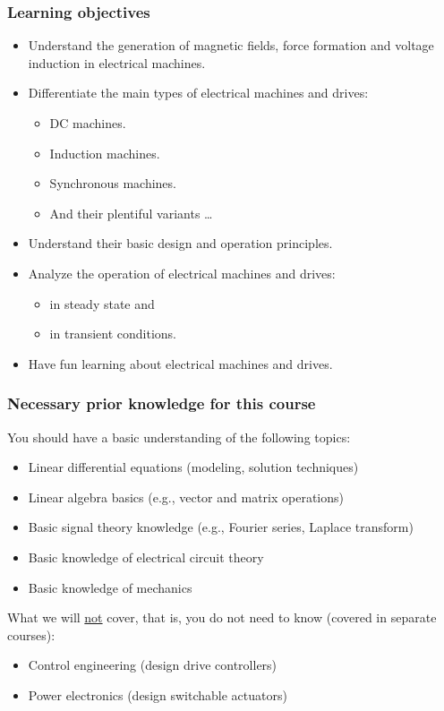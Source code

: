 \begin{frame}
	\frametitle{Learning objectives}
	\begin{itemize}
		\item Understand the generation of magnetic fields, force formation and voltage induction in electrical machines.
		\item Differentiate the main types of electrical machines and drives:
		\begin{itemize}
			\item DC machines. 
			\item Induction machines.
			\item Synchronous machines.
			\item And their plentiful variants \ldots
		\end{itemize}
		\item Understand their basic design and operation principles.
		\item Analyze the operation of electrical machines and drives:
		\begin{itemize}
			\item in steady state and
			\item in transient conditions.
		\end{itemize} 
		\item Have fun learning about electrical machines and drives.
	\end{itemize}
\end{frame}

\begin{frame}
	\frametitle{Necessary prior knowledge for this course}
	You should have a basic understanding of the following topics:
	\begin{itemize}
		\item Linear differential equations (modeling, solution techniques)
		\item Linear algebra basics (e.g., vector and matrix operations)
		\item Basic signal theory knowledge (e.g., Fourier series, Laplace transform)
		\item Basic knowledge of electrical circuit theory
		\item Basic knowledge of mechanics
	\end{itemize}
	\vspace{0.5cm}
	What we will \underline{not} cover, that is, you do not need to know (covered in separate courses):
	\begin{itemize}
		\item Control engineering (design drive controllers)
		\item Power electronics (design switchable actuators)
	\end{itemize}
\end{frame}


